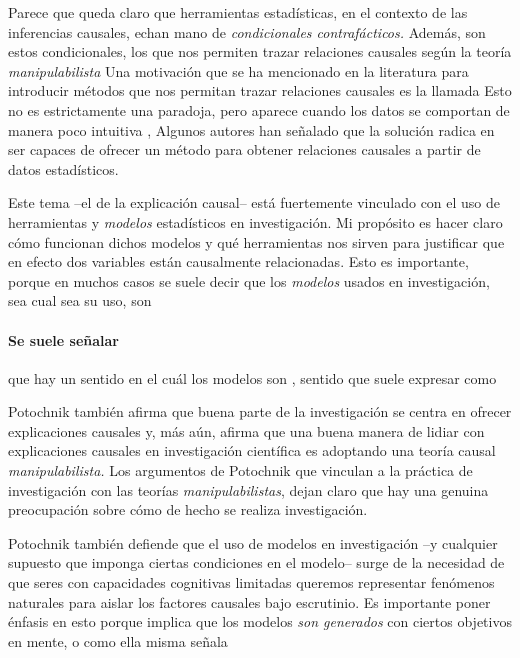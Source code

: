 Parece que queda claro que herramientas estadísticas, en el contexto de las inferencias causales, echan mano de \emph{condicionales contrafácticos.}
Además, son estos condicionales, los que nos permiten trazar relaciones causales según la teoría \emph{manipulabilista}
Una motivación que se ha mencionado en la literatura para introducir métodos que nos permitan trazar relaciones causales es la llamada 
Esto no es estrictamente una paradoja, pero aparece cuando los datos se comportan de manera poco intuitiva \parencite[p.~13]{Hajek2016-HAJOHO},
Algunos autores han señalado que la solución radica en ser capaces de ofrecer un método para obtener relaciones causales a partir de datos estadísticos.

Este tema --el de la explicación causal-- está fuertemente vinculado con el uso de herramientas y \emph{modelos} estadísticos en investigación.
Mi propósito es hacer claro cómo funcionan dichos modelos y qué herramientas nos sirven para justificar que en efecto dos variables están causalmente relacionadas.
Esto es importante, porque en muchos casos se suele decir que los \emph{modelos} usados en investigación, sea cual sea su uso, son 

\paragraph{Se suele señalar} que hay un sentido en el cuál los modelos son , sentido que suele expresar como  \parencite[p.~18, énfasis agregado]{Potochnik2017-POTIAT-3}

Potochnik también afirma que buena parte de la investigación se centra en ofrecer explicaciones causales y, más aún, afirma que una buena manera de lidiar con explicaciones causales en investigación científica es adoptando una teoría causal \emph{manipulabilista.}
Los argumentos de Potochnik que vinculan a la práctica de investigación con las teorías \emph{manipulabilistas}, dejan claro que hay una genuina preocupación sobre cómo de hecho se realiza investigación.

Potochnik también defiende que el uso de modelos en investigación --y cualquier supuesto que imponga ciertas condiciones en el modelo-- surge de la necesidad de que seres con capacidades cognitivas limitadas queremos representar fenómenos naturales para aislar los factores causales bajo escrutinio.
Es importante poner énfasis en esto porque implica que los modelos \emph{son generados} con ciertos objetivos en mente, o como ella misma señala 

